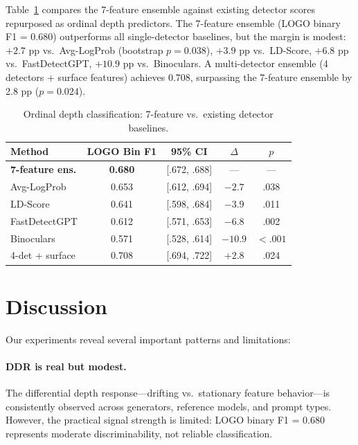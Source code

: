 \documentclass[11pt]{article}
\begin{document}
Table~\ref{tab:baselines} compares the 7-feature ensemble against existing detector scores repurposed as ordinal depth predictors. The 7-feature ensemble (LOGO binary F1 = 0.680) outperforms all single-detector baselines, but the margin is modest: $+2.7$ pp vs.\ Avg-LogProb (bootstrap $p = 0.038$), $+3.9$ pp vs.\ LD-Score, $+6.8$ pp vs.\ FastDetectGPT, $+10.9$ pp vs.\ Binoculars. A multi-detector ensemble (4 detectors + surface features) achieves 0.708, surpassing the 7-feature ensemble by 2.8 pp ($p = 0.024$).

\begin{table}[t]
\centering
\small
\caption{Ordinal depth classification: 7-feature vs.\ existing detector baselines.}
\label{tab:baselines}
\begin{tabular}{lcccc}
\toprule
\textbf{Method} & \textbf{LOGO Bin F1} & \textbf{95\% CI} & \textbf{$\Delta$} & \textbf{$p$} \\
\midrule
\textbf{7-feature ens.} & \textbf{0.680} & [.672, .688] & --- & --- \\
Avg-LogProb & 0.653 & [.612, .694] & $-2.7$ & .038 \\
LD-Score & 0.641 & [.598, .684] & $-3.9$ & .011 \\
FastDetectGPT & 0.612 & [.571, .653] & $-6.8$ & .002 \\
Binoculars & 0.571 & [.528, .614] & $-10.9$ & $<.001$ \\
\midrule
4-det + surface & 0.708 & [.694, .722] & $+2.8$ & .024 \\
\bottomrule
\end{tabular}
\end{table}

\section{Discussion}

Our experiments reveal several important patterns and limitations:

\paragraph{DDR is real but modest.} The differential depth response---drifting vs.\ stationary feature behavior---is consistently observed across generators, reference models, and prompt types. However, the practical signal strength is limited: LOGO binary F1 = 0.680 represents moderate discriminability, not reliable classification.
\end{document}
